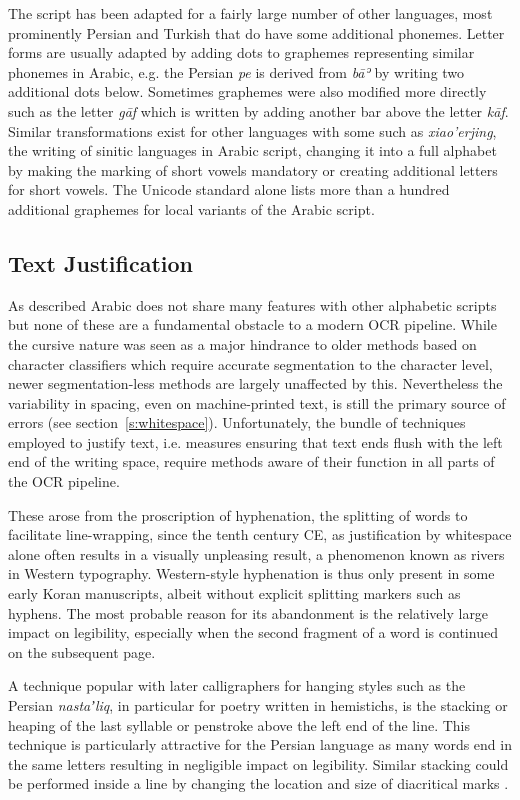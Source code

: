 The script has been adapted for a fairly large number of other languages, most
prominently Persian and Turkish that do have some additional phonemes. Letter
forms are usually adapted by adding dots to graphemes representing similar
phonemes in Arabic, e.g. the Persian \emph{pe} is derived from \emph{bāʾ} by
writing two additional dots below. Sometimes graphemes were also modified more
directly such as the letter \emph{gāf} which is written by adding another bar
above the letter \emph{kāf}. Similar transformations exist for other languages
with some such as \emph{xiao'erjing}, the writing of sinitic languages in
Arabic script, changing it into a full alphabet by making the marking of short
vowels mandatory or creating additional letters for short vowels. The Unicode
standard alone lists more than a hundred additional graphemes for local
variants of the Arabic script.

\subsection{Text Justification}

As described Arabic does not share many features with other alphabetic scripts
but none of these are a fundamental obstacle to a modern OCR pipeline.  While
the cursive nature was seen as a major hindrance to older methods based on
character classifiers which require accurate segmentation to the character
level, newer segmentation-less methods are largely unaffected by this.
Nevertheless the variability in spacing, even on machine-printed text, is still
the primary source of errors (see section~\ref{s:whitespace}). Unfortunately,
the bundle of techniques employed to justify text, i.e. measures ensuring that
text ends flush with the left end of the writing space, require methods aware
of their function in all parts of the OCR pipeline.

These arose from the proscription of hyphenation, the splitting of words to
facilitate line-wrapping, since the tenth century CE, as justification by
whitespace alone often results in a visually unpleasing result, a phenomenon
known as rivers in Western typography. Western-style hyphenation is thus only
present in some early Koran manuscripts, albeit without explicit splitting
markers such as hyphens. The most probable reason for its abandonment is the
relatively large impact on legibility, especially when the second fragment of a
word is continued on the subsequent page.

A technique popular with later calligraphers for hanging styles such as the
Persian \emph{nastaʼliq}, in particular for poetry written in hemistichs, is
the stacking or heaping of the last syllable or penstroke above the left end of
the line. This technique is particularly attractive for the Persian language
as many words end in the same letters resulting in negligible impact on
legibility. Similar stacking could be performed inside a line by changing the
location and size of diacritical marks \cite[pg. 14]{blair2006islamic}.

